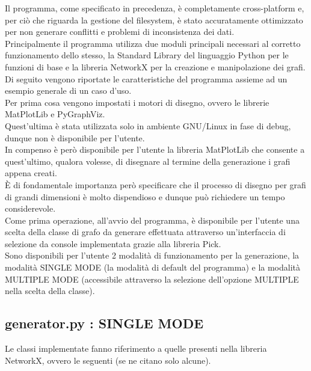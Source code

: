Il programma, come specificato in precedenza, è completamente cross-platform e, per ciò che riguarda la gestione del filesystem, è stato accuratamente ottimizzato per non generare conflitti e problemi di inconsistenza dei dati.\\

Principalmente il programma utilizza due moduli principali necessari al corretto funzionamento dello stesso, la Standard Library del linguaggio Python per le funzioni di base e la libreria NetworkX per la creazione e manipolazione dei grafi.\\

Di seguito vengono riportate le caratteristiche del programma assieme ad un esempio generale di un caso d'uso.\\

Per prima cosa vengono impostati i motori di disegno, ovvero le librerie MatPlotLib e PyGraphViz.\\
Quest'ultima è stata utilizzata solo in ambiente GNU/Linux in fase di debug, dunque non è disponibile per l'utente.\\

In compenso è però disponibile per l'utente la libreria MatPlotLib che consente a quest'ultimo, qualora volesse, di disegnare al termine della generazione i grafi appena creati.\\
È di fondamentale importanza però specificare che il processo di disegno per grafi di grandi dimensioni è molto dispendioso e dunque può richiedere un tempo considerevole.\\

Come prima operazione, all'avvio del programma, è disponibile per l'utente una scelta della classe di grafo da generare effettuata attraverso un'interfaccia di selezione da console implementata grazie alla libreria Pick.\\

Sono disponibili per l'utente 2 modalità di funzionamento per la generazione, la modalità SINGLE MODE (la modalità di default del programma) e la modalità MULTIPLE MODE (accessibile attraverso la selezione dell'opzione MULTIPLE nella scelta della classe).\\

\subsection{generator.py : SINGLE MODE}
\justify
Le classi implementate fanno riferimento a quelle presenti nella libreria NetworkX, ovvero le seguenti (se ne citano solo alcune).

